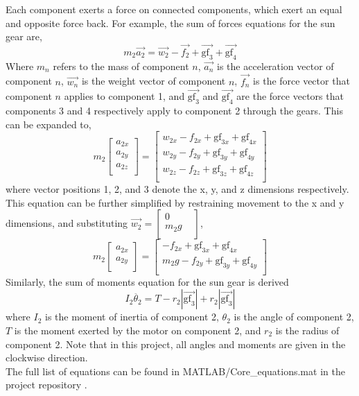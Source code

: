 Each component exerts a force on connected components, which exert an equal and opposite force back.
For example, the sum of forces equations for the sun gear are,\\
\begin{equation}
	m_2\vec{a_2} = \vec{w_2}-\vec{f_2}+\vec{\mathrm{gf}_3}+\vec{\mathrm{gf}_4}
\end{equation}
Where $m_n$ refers to the mass of component $n$, $\vec{a_n}$ is the acceleration vector of component $n$, $\vec{w_n}$ is the weight vector of component $n$, $\vec{f_n}$ is the force vector that component $n$ applies to component 1,  and $\vec{\mathrm{gf}_3}$ and $\vec{\mathrm{gf}_4}$ are the force vectors that components 3 and 4 respectively apply to component 2 through the gears.
This can be expanded to,
\begin{equation}
	m_2
	\begin{bmatrix}
		a_{2x}\\
		a_{2y}\\
		a_{2z}\\
	\end{bmatrix}
	=
	\begin{bmatrix}
		w_{2x}-f_{2x}+\mathrm{gf}_{3x}+\mathrm{gf}_{4x}\\
		w_{2y}-f_{2y}+\mathrm{gf}_{3y}+\mathrm{gf}_{4y}\\
		w_{2z}-f_{2z}+\mathrm{gf}_{3z}+\mathrm{gf}_{4z}\\
	\end{bmatrix}
\end{equation}
where vector positions 1, 2, and 3 denote the x, y, and z dimensions respectively. This equation can be further simplified by restraining movement to the x and y dimensions, and substituting $\vec{w_2} = \begin{bmatrix} 0 \\ m_2g & \\ \end{bmatrix}$,
\begin{equation}
	m_2
	\begin{bmatrix}
		a_{2x}\\
		a_{2y}\\
	\end{bmatrix}
	=
	\begin{bmatrix}
		-f_{2x}+\mathrm{gf}_{3x}+\mathrm{gf}_{4x}\\
		m_2g-f_{2y}+\mathrm{gf}_{3y}+\mathrm{gf}_{4y}\\
	\end{bmatrix}
\end{equation}
Similarly, the sum of moments equation for the sun gear is derived
\begin{equation}
	I_2\ddot{\theta_2} = T - r_2|\vec{\mathrm{gf}_3}| + r_2|\vec{\mathrm{gf}_3}|
\end{equation}
where $I_2$ is the moment of inertia of component 2, $\theta_2$ is the angle of component 2, $T$ is the moment exerted by the motor on component 2, and $r_2$ is the radius of component 2. Note that in this project, all angles and moments are given in the clockwise direction.
\\
The full list of equations can be found in MATLAB/Core\_equations.mat in the project repository \citep{repo}.



